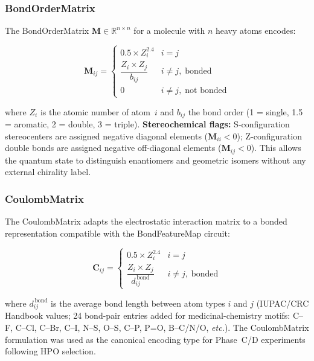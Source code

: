 \subsubsection{BondOrderMatrix}

The BondOrderMatrix $\mathbf{M} \in \mathbb{R}^{n \times n}$ for a molecule
with $n$ heavy atoms encodes:

\begin{equation}
\mathbf{M}_{ij} =
\begin{cases}
0.5 \times Z_i^{2.4}           & i = j \\[4pt]
\dfrac{Z_i \times Z_j}{b_{ij}} & i \neq j,\; \text{bonded} \\[2pt]
0                               & i \neq j,\; \text{not bonded}
\end{cases}
\end{equation}

where $Z_i$ is the atomic number of atom~$i$ and $b_{ij}$ the bond order
(1 = single, 1.5 = aromatic, 2 = double, 3 = triple).
\textbf{Stereochemical flags:} S-configuration stereocenters are assigned
negative diagonal elements ($\mathbf{M}_{ii} < 0$); Z-configuration double
bonds are assigned negative off-diagonal elements ($\mathbf{M}_{ij} < 0$).
This allows the quantum state to distinguish enantiomers and geometric isomers
without any external chirality label\cite{boy2025}.

\subsubsection{CoulombMatrix}

The CoulombMatrix\cite{rupp2012} adapts the electrostatic interaction matrix
to a bonded representation compatible with the BondFeatureMap circuit:

\begin{equation}
\mathbf{C}_{ij} =
\begin{cases}
0.5 \times Z_i^{2.4}                     & i = j \\[4pt]
\dfrac{Z_i \times Z_j}{d_{ij}^{\,\text{bond}}} & i \neq j,\; \text{bonded}
\end{cases}
\end{equation}

where $d_{ij}^{\,\text{bond}}$ is the average bond length between atom types
$i$ and $j$ (IUPAC/CRC Handbook values; 24 bond-pair entries added for
medicinal-chemistry motifs: C--F, C--Cl, C--Br, C--I, N--S, O--S, C--P,
P=O, B--C/N/O, \textit{etc.}). The CoulombMatrix formulation was used as
the canonical encoding type for Phase~C/D experiments following HPO
selection.

